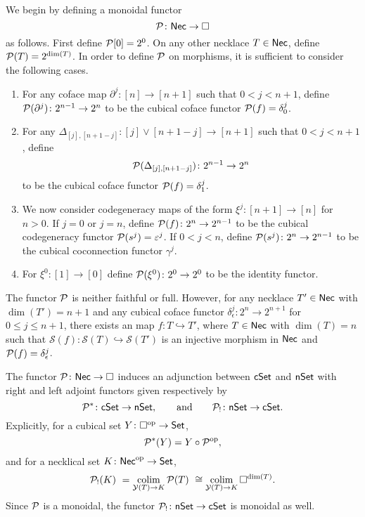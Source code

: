 We begin by defining a monoidal functor
\[
\mathcal{P} \colon \mathsf{Nec} \to \square
\]
as follows.
First define $\mathcal{P}[0] = 2^0$.
On any other necklace $T \in \mathsf{Nec}$, define $\mathcal{P}(T) = 2^{\dim(T)}$.
In order to define $\mathcal{P}$ on morphisms, it is sufficient to consider the following cases.
\begin{enumerate}
	\item For any coface map $\partial^j \colon [n] \to [n+1]$ such that $0< j<{n+1}$, define $\mathcal{P}(\partial^j) \colon 2^{n-1}\to 2^{n}$ to be the cubical coface functor $\mathcal{P}(f)= \delta_0^{j}$.

	\item For any $\Delta_{[j], [n+1-j]} \colon [j] \vee [n+1-j] \to [n+1]$ such that $0<j<n+1$, define
	\[
	\mathcal{P}(\Delta_{[j], [n+1-j]}) \colon 2^{n-1}\to 2^{n}
	\]
	to be the cubical coface functor $\mathcal{P}(f)=\delta_1^{j}$.

	\item We now consider codegeneracy maps of the form $\xi^j \colon [n+1] \to [n]$ for $n>0$.
	If $j=0$ or $j=n$, define $\mathcal{P}(f) \colon 2^n \to 2^{n-1}$ to be the cubical codegeneracy functor $\mathcal{P}(s^j)= \varepsilon^{j}$.
	If $0<j<n$, define $\mathcal{P}(s^j) \colon 2^n \to 2^{n-1}$ to be the cubical coconnection functor $\gamma^{j}$.

	\item For $\xi^0 \colon [1] \to [0]$ define $\mathcal{P}(\xi^0) \colon 2^0 \to 2^0$ to be the identity functor.
\end{enumerate}

\begin{remark*}
	The functor $\mathcal{P}$ is neither faithful or full.
	However, for any necklace $T' \in \mathsf{Nec}$ with $\dim(T')=n+1$ and any cubical coface functor $\delta_{\epsilon}^j \colon 2^n \to 2^{n+1}$ for $0 \leq j \leq n+1$, there exists an map $f \colon T \hookrightarrow T'$, where $T \in \mathsf{Nec}$ with $\dim(T)=n$ such that $\mathcal{S}(f) \colon \mathcal{S}(T) \hookrightarrow \mathcal{S}(T')$ is an injective morphism in $\mathsf{Nec}$ and $\mathcal{P}(f) = \delta_{\epsilon}^j$.
\end{remark*}

The functor $\mathcal{P} \colon \mathsf{Nec} \to \square$ induces an adjunction between $\mathsf{cSet}$ and $\mathsf{nSet}$ with right and left adjoint functors given respectively by
\[
\mathcal{P}^\ast \colon \mathsf{cSet} \to \mathsf{nSet},
\qquad \text{and} \qquad
\mathcal{P}_{!} \colon \mathsf{nSet} \to \mathsf{cSet}.
\]
Explicitly, for a cubical set $Y \colon \square^{\mathrm{op}} \to \mathsf{Set}$,
\[
\mathcal{P}^\ast(Y)= Y \circ \mathcal{P}^{\mathrm{op}},
\]
and for a necklical set $K \colon \mathsf{Nec}^{\mathrm{op}} \to \mathsf{Set}$,
\[
\mathcal{P}_{!}(K) \ =
\operatorname*{colim}_{\mathcal{Y}(T) \to K} \mathcal{P}(T) \ \cong
\operatorname*{colim}_{\mathcal{Y}(T) \to K} \square^{\dim(T)}.
\]
Since $\mathcal{P}$ is a monoidal, the functor $\mathcal{P}_{!} \colon \mathsf{nSet} \to \mathsf{cSet}$ is monoidal as well.

